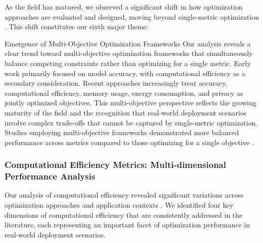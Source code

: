 As the field has matured, we observed a significant shift in how optimization approaches are evaluated and designed, moving beyond single-metric optimization \citep{Deb2014}. This shift constitutes our sixth major theme:

\begin{themebox}{Emergence of Multi-Objective Optimization Frameworks}
Our analysis reveals a clear trend toward multi-objective optimization frameworks that simultaneously balance competing constraints rather than optimizing for a single metric. Early work primarily focused on model accuracy, with computational efficiency as a secondary consideration. Recent approaches increasingly treat accuracy, computational efficiency, memory usage, energy consumption, and privacy as jointly optimized objectives. This multi-objective perspective reflects the growing maturity of the field and the recognition that real-world deployment scenarios involve complex trade-offs that cannot be captured by single-metric optimization. Studies employing multi-objective frameworks demonstrated more balanced performance across metrics compared to those optimizing for a single objective \citep{Deb2014}.
\end{themebox}

\subsubsection{Computational Efficiency Metrics: Multi-dimensional Performance Analysis}
Our analysis of computational efficiency revealed significant variations across optimization approaches and application contexts \citep{Wang2021, Kim2022, Lin2022, Park2022}. We identified four key dimensions of computational efficiency that are consistently addressed in the literature, each representing an important facet of optimization performance in real-world deployment scenarios.

